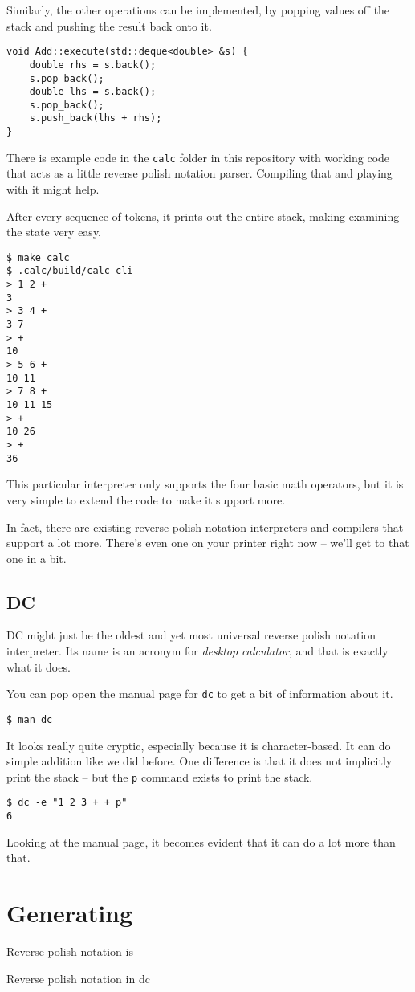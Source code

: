 \documentclass[a4paper,twocolumn]{article}
\begin{document}
Similarly, the other operations can be implemented, by popping values off the stack and pushing the result back onto it.

\begin{verbatim}
void Add::execute(std::deque<double> &s) {
    double rhs = s.back();
    s.pop_back();
    double lhs = s.back();
    s.pop_back();
    s.push_back(lhs + rhs);
}  
\end{verbatim}

There is example code in the \verb|calc| folder in this repository with working code that acts as a little reverse polish notation parser. Compiling that and playing with it might help.

After every sequence of tokens, it prints out the entire stack, making examining the state very easy.

\begin{verbatim}
$ make calc
$ .calc/build/calc-cli
> 1 2 +
3
> 3 4 +
3 7
> +
10
> 5 6 +
10 11
> 7 8 +
10 11 15
> +
10 26
> +
36
\end{verbatim}

This particular interpreter only supports the four basic math operators, but it is very simple to extend the code to make it support more.

In fact, there are existing reverse polish notation interpreters and compilers that support a lot more. There's even one on your printer right now -- we'll get to that one in a bit.

\subsection{DC}

DC might just be the oldest and yet most universal reverse polish notation interpreter. Its name is an acronym for \emph{desktop calculator}, and that is exactly what it does.

You can pop open the manual page for \verb|dc| to get a bit of information about it.

\begin{verbatim}
$ man dc
\end{verbatim}

It looks really quite cryptic, especially because it is character-based. It can do simple addition like we did before. One difference is that it does not implicitly print the stack -- but the \verb|p| command exists to print the stack.

\begin{verbatim}
$ dc -e "1 2 3 + + p"
6
\end{verbatim}

Looking at the manual page, it becomes evident that it can do a lot more than that. 


\section{Generating}

Reverse polish notation is


Reverse polish notation in dc
\end{document}
